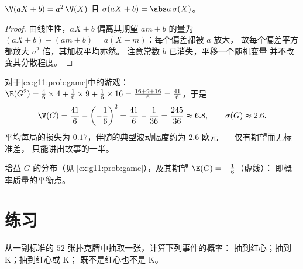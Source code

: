 \begin{proposition}[仿射变换]\label{prop:g11:prob:affine}
$\V(aX + b) = a^2\,\V(X)$ 且 $\sigma(aX + b) = \abs a\,\sigma(X)$。
\end{proposition}

\begin{proof}
由线性性，$aX + b$ 偏离其期望 $a m + b$ 的量为
$(aX + b) - (am + b) = a(X - m)$：每个偏差都被 $a$ 放大，
故每个偏差平方都放大 $a^2$ 倍，其加权平均亦然。
注意常数 $b$ 已消失，平移一个随机变量
并不改变其分散程度。
\end{proof}

\begin{example}\label{ex:g11:prob:variance}
对于\cref{ex:g11:prob:game}中的游戏：
$\E(G^2) = \frac46 \times 4 + \frac16 \times 9 + \frac16 \times 16
= \frac{16 + 9 + 16}{6} = \frac{41}{6}$，于是
\[
\V(G) = \frac{41}{6} - \left(-\frac16\right)^2
= \frac{41}{6} - \frac{1}{36} = \frac{245}{36} \approx 6.8,
\qquad
\sigma(G) \approx 2.6 .
\]
平均每局的损失为 $0.17$，伴随的典型波动幅度约为
$2.6$ 欧元——仅有期望而无标准差，
只能讲出故事的一半。
\end{example}

\begin{omfigure}

{\small 增益 $G$ 的分布（见
\cref{ex:g11:prob:game}），及其期望 $\E(G) = -\frac16$（虚线）：
即概率质量的平衡点。}
\end{omfigure}

\section{练习}

\begin{exercise}[$\star$]\label{exo:g11:prob:1}
从一副标准的 $52$ 张扑克牌中抽取一张，计算下列事件的概率：
抽到红心；抽到 K；抽到红心或 K；
既不是红心也不是 K。
\end{exercise}

